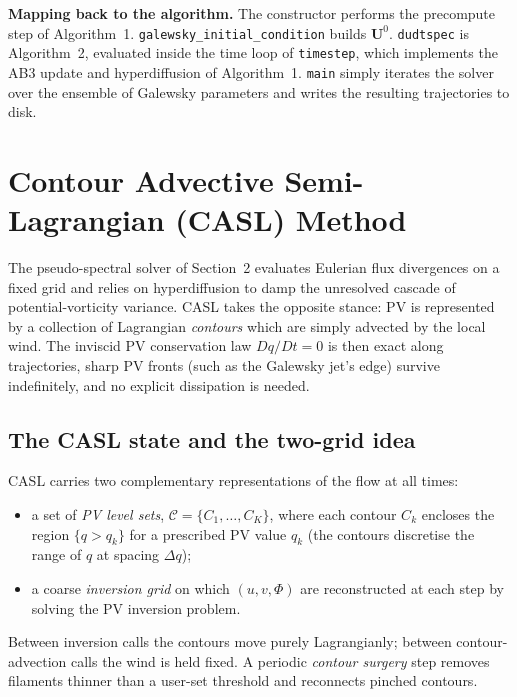 \documentclass[11pt]{article}
\newcommand{\bvec}[1]{\boldsymbol{#1}}
\begin{document}
\medskip
\noindent\textbf{Mapping back to the algorithm.}
The constructor performs the precompute step of Algorithm~1.
\texttt{galewsky\_initial\_condition} builds $\bvec{U}^{0}$.
\texttt{dudtspec} is Algorithm~2, evaluated inside the time loop of
\texttt{timestep}, which implements the AB3 update and hyperdiffusion
of Algorithm~1.  \texttt{main} simply iterates the solver over the
ensemble of Galewsky parameters and writes the resulting trajectories
to disk.

\section{Contour Advective Semi-Lagrangian (CASL) Method}

The pseudo-spectral solver of Section~2 evaluates Eulerian flux
divergences on a fixed grid and relies on hyperdiffusion to damp the
unresolved cascade of potential-vorticity variance.  CASL takes the
opposite stance: PV is represented by a collection of Lagrangian
\emph{contours} which are simply advected by the local wind.  The
inviscid PV conservation law $Dq/Dt = 0$ is then exact along
trajectories, sharp PV fronts (such as the Galewsky jet's edge) survive
indefinitely, and no explicit dissipation is needed.

\subsection{The CASL state and the two-grid idea}

CASL carries two complementary representations of the flow at all
times:
\begin{itemize}
    \item a set of \emph{PV level sets},
          $\mathcal{C} = \{C_{1},\dots,C_{K}\}$, where each contour
          $C_{k}$ encloses the region $\{q > q_{k}\}$ for a prescribed
          PV value $q_{k}$ (the contours discretise the range of $q$ at
          spacing $\Delta q$);
    \item a coarse \emph{inversion grid} on which $(u,v,\Phi)$ are
          reconstructed at each step by solving the PV inversion
          problem.
\end{itemize}
Between inversion calls the contours move purely Lagrangianly; between
contour-advection calls the wind is held fixed.  A periodic
\emph{contour surgery} step removes filaments thinner than a user-set
threshold and reconnects pinched contours.
\end{document}
